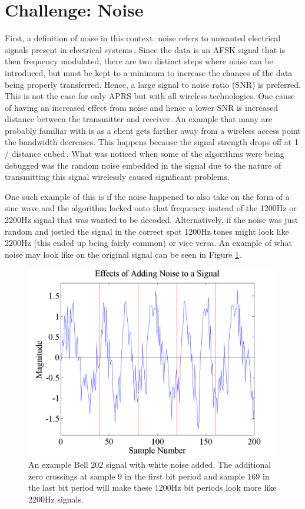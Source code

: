 \section{Challenge: Noise}
First, a definition of noise in this context: noise refers to unwanted electrical signals present in electrical systems\,\cite{Sklar1988}. Since the data is an AFSK signal that is then frequency modulated, there are two distinct steps where noise can be introduced, but must be kept to a minimum to increase the chances of the data being properly transferred. Hence, a large signal to noise ratio (SNR) is preferred. This is not the case for only APRS but with all wireless technologies. One cause of having an increased effect from noise and hence a lower SNR is increased distance between the transmitter and receiver. An example that many are probably familiar with is as a client gets farther away from a wireless access point the bandwidth decreases. This happens because the signal strength drops off at 1 / distance cubed\,\cite{4Gon}. What was noticed when some of the algorithms were being debugged was the random noise embedded in the signal due to the nature of transmitting this signal wirelessly caused significant problems.

One such example of this is if the noise happened to also take on the form of a sine wave and the algorithm locked onto that frequency instead of the 1200Hz or 2200Hz signal that was wanted to be decoded. Alternatively, if the noise was just random and jostled the signal in the correct spot 1200Hz tones might look like 2200Hz (this ended up being fairly common) or vice versa. An example of what noise may look like on the original signal can be seen in Figure \ref{noiseExample}.
\begin{figure}
  \centering
	\includegraphics[width=0.75\linewidth]{images/EffectsofAddingNoisetoaSignal.png} 
	\caption[An example Bell 202 signal with white noise added.]{An example Bell 202 signal with white noise added. The additional zero crossings at sample 9 in the first bit period and sample 169 in the last bit period will make these 1200Hz bit periods look more like 2200Hz signals.}
   \label{noiseExample}
\end{figure}

